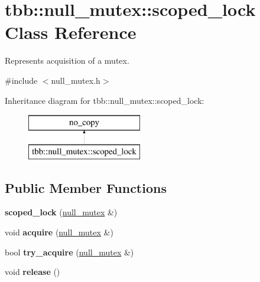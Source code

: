 \hypertarget{classtbb_1_1null__mutex_1_1scoped__lock}{}\section{tbb\+:\+:null\+\_\+mutex\+:\+:scoped\+\_\+lock Class Reference}
\label{classtbb_1_1null__mutex_1_1scoped__lock}


Represents acquisition of a mutex.  




{\ttfamily \#include $<$null\+\_\+mutex.\+h$>$}

Inheritance diagram for tbb\+:\+:null\+\_\+mutex\+:\+:scoped\+\_\+lock\+:\begin{figure}[H]
\begin{center}
\leavevmode
\includegraphics[height=2.000000cm]{classtbb_1_1null__mutex_1_1scoped__lock}
\end{center}
\end{figure}
\subsection*{Public Member Functions}
\begin{DoxyCompactItemize}
\item 
\hypertarget{classtbb_1_1null__mutex_1_1scoped__lock_af71834d1fc4c7406595e9df5b43ab7bb}{}{\bfseries scoped\+\_\+lock} (\hyperlink{classtbb_1_1null__mutex}{null\+\_\+mutex} \&)\label{classtbb_1_1null__mutex_1_1scoped__lock_af71834d1fc4c7406595e9df5b43ab7bb}

\item 
\hypertarget{classtbb_1_1null__mutex_1_1scoped__lock_a7d541c92b1678a7dde6a45783a02160f}{}void {\bfseries acquire} (\hyperlink{classtbb_1_1null__mutex}{null\+\_\+mutex} \&)\label{classtbb_1_1null__mutex_1_1scoped__lock_a7d541c92b1678a7dde6a45783a02160f}

\item 
\hypertarget{classtbb_1_1null__mutex_1_1scoped__lock_ac5d4d5a4182091ea13fb5d38667f6449}{}bool {\bfseries try\+\_\+acquire} (\hyperlink{classtbb_1_1null__mutex}{null\+\_\+mutex} \&)\label{classtbb_1_1null__mutex_1_1scoped__lock_ac5d4d5a4182091ea13fb5d38667f6449}

\item 
\hypertarget{classtbb_1_1null__mutex_1_1scoped__lock_a21f848f83dfa6504381e3da4de7a9e00}{}void {\bfseries release} ()\label{classtbb_1_1null__mutex_1_1scoped__lock_a21f848f83dfa6504381e3da4de7a9e00}

\end{DoxyCompactItemize}


